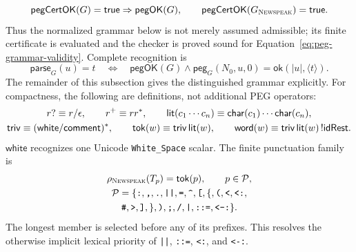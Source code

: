 \begin{equation}\label{eq:peg-certificate-soundness}
 \mathsf{pegCertOK}(G)=\mathsf{true}\Rightarrow\mathsf{pegOK}(G),
 \qquad
 \mathsf{pegCertOK}(G_{\textsc{Newspeak}})=\mathsf{true}.
\end{equation}
Thus the normalized grammar below is not merely assumed admissible; its finite
certificate is evaluated and the checker is proved sound for
Equation~\eqref{eq:peg-grammar-validity}.
Complete recognition is
\begin{equation}\label{eq:peg-complete-parse}
 \mathsf{parse}_{G}(u)=t
 \quad\Longleftrightarrow\quad
 \mathsf{pegOK}(G)\land
 \mathsf{peg}_{G}(N_0,u,0)=\mathsf{ok}(|u|,\langle t\rangle).
\end{equation}
The remainder of this subsection gives the distinguished grammar explicitly.
For compactness, the following are definitions, not additional PEG operators:
\begin{equation}\label{eq:peg-derived-notation}
 \begin{gathered}
 r?\equiv r/\epsilon,\qquad r^+\equiv rr^*,\qquad
 \mathsf{lit}(c_1\cdots c_n)\equiv
   \mathsf{char}(c_1)\cdots\mathsf{char}(c_n),\\
 \mathsf{triv}\equiv(\mathsf{white}/\mathsf{comment})^*,\qquad
 \mathsf{tok}(w)\equiv\mathsf{triv}\,\mathsf{lit}(w),\qquad
 \mathsf{word}(w)\equiv\mathsf{triv}\,\mathsf{lit}(w)\,!\mathsf{idRest}.
 \end{gathered}
\end{equation}
$\mathsf{white}$ recognizes one Unicode \texttt{White\_Space} scalar.
The finite punctuation family is
\begin{equation}\label{eq:newspeak-punctuation-peg}
\begin{gathered}
 \rho_{\NS}(T_p)=\mathsf{tok}(p),\qquad p\in\mathcal P,\\
 \mathcal P=\{\texttt{:},\texttt{,},\texttt{.},\texttt{||},\texttt{=},
 \texttt{\char94},\texttt{[},\{,\texttt{(},\texttt{<},\texttt{<:},\\
 \texttt{\#},\texttt{>},\texttt{]},\},\texttt{)},\texttt{;},
 \texttt{/},\texttt{|},\texttt{::=},\texttt{<-:}\}.
\end{gathered}
\end{equation}
The longest member is selected before any of its prefixes.  This resolves the
otherwise implicit lexical priority of \texttt{||}, \texttt{::=},
\texttt{<:}, and \texttt{<-:}.

